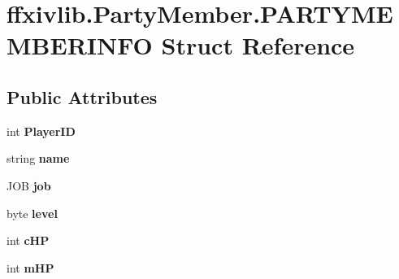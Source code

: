\hypertarget{structffxivlib_1_1_party_member_1_1_p_a_r_t_y_m_e_m_b_e_r_i_n_f_o}{\section{ffxivlib.\-Party\-Member.\-P\-A\-R\-T\-Y\-M\-E\-M\-B\-E\-R\-I\-N\-F\-O Struct Reference}
\label{structffxivlib_1_1_party_member_1_1_p_a_r_t_y_m_e_m_b_e_r_i_n_f_o}
}
\subsection*{Public Attributes}
\begin{DoxyCompactItemize}
\item 
\hypertarget{structffxivlib_1_1_party_member_1_1_p_a_r_t_y_m_e_m_b_e_r_i_n_f_o_a58cd6e399a19de16d25ddd42e8518144}{int {\bfseries Player\-I\-D}}\label{structffxivlib_1_1_party_member_1_1_p_a_r_t_y_m_e_m_b_e_r_i_n_f_o_a58cd6e399a19de16d25ddd42e8518144}

\item 
\hypertarget{structffxivlib_1_1_party_member_1_1_p_a_r_t_y_m_e_m_b_e_r_i_n_f_o_a4492548143962ad7df8b67a6002c6045}{string {\bfseries name}}\label{structffxivlib_1_1_party_member_1_1_p_a_r_t_y_m_e_m_b_e_r_i_n_f_o_a4492548143962ad7df8b67a6002c6045}

\item 
\hypertarget{structffxivlib_1_1_party_member_1_1_p_a_r_t_y_m_e_m_b_e_r_i_n_f_o_af10347eeb797e20f6de779bbbbadcff4}{J\-O\-B {\bfseries job}}\label{structffxivlib_1_1_party_member_1_1_p_a_r_t_y_m_e_m_b_e_r_i_n_f_o_af10347eeb797e20f6de779bbbbadcff4}

\item 
\hypertarget{structffxivlib_1_1_party_member_1_1_p_a_r_t_y_m_e_m_b_e_r_i_n_f_o_a89ee49f09068f4c061341b09a600f6fd}{byte {\bfseries level}}\label{structffxivlib_1_1_party_member_1_1_p_a_r_t_y_m_e_m_b_e_r_i_n_f_o_a89ee49f09068f4c061341b09a600f6fd}

\item 
\hypertarget{structffxivlib_1_1_party_member_1_1_p_a_r_t_y_m_e_m_b_e_r_i_n_f_o_aaf8131973fc3b9edb108d5b98e5edb78}{int {\bfseries c\-H\-P}}\label{structffxivlib_1_1_party_member_1_1_p_a_r_t_y_m_e_m_b_e_r_i_n_f_o_aaf8131973fc3b9edb108d5b98e5edb78}

\item 
\hypertarget{structffxivlib_1_1_party_member_1_1_p_a_r_t_y_m_e_m_b_e_r_i_n_f_o_abd323379e9c68fdac70c7ed6522eec5b}{int {\bfseries m\-H\-P}}\label{structffxivlib_1_1_party_member_1_1_p_a_r_t_y_m_e_m_b_e_r_i_n_f_o_abd323379e9c68fdac70c7ed6522eec5b}


\end{DoxyCompactItemize}
